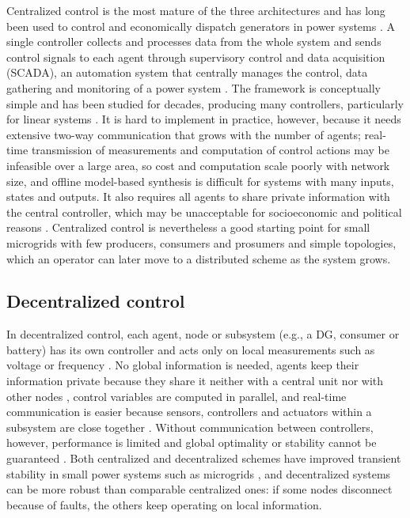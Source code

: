 \documentclass[final,3p,times]{elsarticle}
\begin{document}
Centralized control is the most mature of the three architectures and has long been used to control and economically dispatch generators in power systems \cite{su2015}. A single controller collects and processes data from the whole system and sends control signals to each agent through supervisory control and data acquisition (SCADA), an automation system that centrally manages the control, data gathering and monitoring of a power system \cite{scada}. The framework is conceptually simple and has been studied for decades, producing many controllers, particularly for linear systems \cite{farina2012}. It is hard to implement in practice, however, because it needs extensive two-way communication that grows with the number of agents; real-time transmission of measurements and computation of control actions may be infeasible over a large area, so cost and computation scale poorly with network size, and offline model-based synthesis is difficult for systems with many inputs, states and outputs. It also requires all agents to share private information with the central controller, which may be unacceptable for socioeconomic and political reasons \cite{farina2012}. Centralized control is nevertheless a good starting point for small microgrids with few producers, consumers and prosumers and simple topologies, which an operator can later move to a distributed scheme as the system grows.

\subsection{Decentralized control}

In decentralized control, each agent, node or subsystem (e.g., a DG, consumer or battery) has its own controller and acts only on local measurements such as voltage or frequency \cite{pourbabak2017}. No global information is needed, agents keep their information private because they share it neither with a central unit nor with other nodes \cite{gan2012}, control variables are computed in parallel, and real-time communication is easier because sensors, controllers and actuators within a subsystem are close together \cite{farina2012}. Without communication between controllers, however, performance is limited and global optimality or stability cannot be guaranteed \cite{pourbabak2017}. Both centralized and decentralized schemes have improved transient stability in small power systems such as microgrids \cite{senjyu2005}, and decentralized systems can be more robust than comparable centralized ones: if some nodes disconnect because of faults, the others keep operating on local information.
\end{document}

